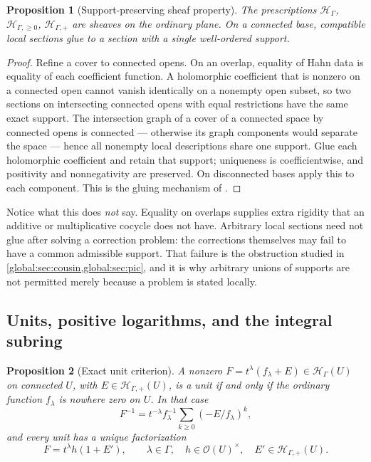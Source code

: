 \documentclass[11pt,letterpaper]{article}
\newtheorem{proposition}[proposition]{Proposition}
\theoremstyle{definition}
\theoremstyle{remark}
\newcommand{\OO}{\mathcal O}
\newcommand{\HH}{\mathscr H_\Gamma}
\newcommand{\HP}{\mathscr H_{\Gamma,+}}
\newcommand{\HI}{\mathscr H_{\Gamma,\ge0}}
\numberwithin{equation}{section}
\begin{document}
\begin{proposition}[Support-preserving sheaf property]\label{global:prop:sheaf}
The prescriptions $\HH$, $\HI$, $\HP$ are sheaves on the ordinary plane. On a connected base, compatible local sections glue to a section with a \emph{single} well-ordered support.
\end{proposition}

\begin{proof}
Refine a cover to connected opens. On an overlap, equality of Hahn data is equality of each coefficient function. A holomorphic coefficient that is nonzero on a connected open cannot vanish identically on a nonempty open subset, so two sections on intersecting connected opens with equal restrictions have the same exact support. The intersection graph of a cover of a connected space by connected opens is connected --- otherwise its graph components would separate the space --- hence all nonempty local descriptions share one support. Glue each holomorphic coefficient and retain that support; uniqueness is coefficientwise, and positivity and nonnegativity are preserved. On disconnected bases apply this to each component. This is the gluing mechanism of \cite[\S5]{Source}.
\end{proof}

Notice what this does \emph{not} say. Equality on overlaps supplies extra rigidity that an additive or multiplicative cocycle does not have. Arbitrary local sections need not glue after solving a correction problem: the corrections themselves may fail to have a common admissible support. That failure is the obstruction studied in \cref{global:sec:cousin,global:sec:pic}, and it is why arbitrary unions of supports are not permitted merely because a problem is stated locally.

\subsection{Units, positive logarithms, and the integral subring}

\begin{proposition}[Exact unit criterion]\label{global:prop:units}
A nonzero $F=t^\lambda(f_\lambda+E)\in\HH(U)$ on connected $U$, with $E\in\HP(U)$, is a unit if and only if the ordinary function $f_\lambda$ is nowhere zero on $U$. In that case
\begin{equation}\label{global:eq:unitinverse}
  F^{-1}=t^{-\lambda}f_\lambda^{-1}\sum_{k\ge0}(-E/f_\lambda)^k,
\end{equation}
and every unit has a unique factorization
\begin{equation}\label{global:eq:unitfactor}
  F=t^\lambda h(1+E'),\qquad
  \lambda\in\Gamma,\quad h\in\OO(U)^\times,\quad E'\in\HP(U).
\end{equation}
\end{proposition}
\end{document}
